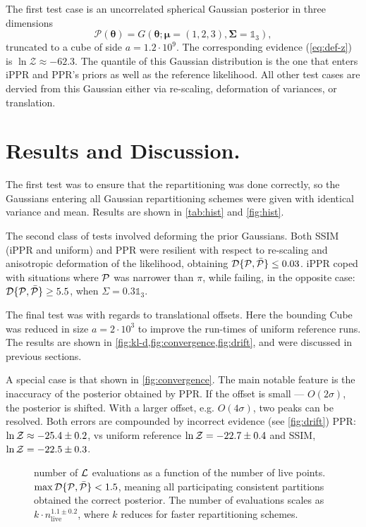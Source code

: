 \documentclass[usenatbib]{mnras}
\begin{document}
The first test case is an uncorrelated spherical Gaussian posterior
in three dimensions
\begin{equation}
\mathcal{P}(\bm{\theta}) = G(\bm{\theta}; \bm{\mu} =
  (1,2,3),\bm{\Sigma} = \mathds{1}_{3}),
\end{equation}
truncated to a cube of side \(a = 1.2 \cdot 10^{9}\). The
corresponding evidence (\cref{eq:def-z}) is
\(\ln \mathcal{Z}\approx-62.3\). The quantile of this Gaussian
distribution is the one that enters iPPR and PPR's priors as well as
the reference likelihood. All other test cases are dervied from this
Gaussian either via re-scaling, deformation of variances, or
translation. 


\section{Results and Discussion.}\label{sec:results}
The first test was to ensure that the repartitioning was done
correctly, so the Gaussians entering all Gaussian repartitioning
schemes were given with identical variance and mean. Results are shown
in \cref{tab:hist} and \cref{fig:hist}.


The second class of tests involved deforming the prior Gaussians.
Both SSIM (iPPR and uniform) and PPR were resilient with respect to
re-scaling and anisotropic deformation of the likelihood, obtaining
${\cal D}\{ {\cal P}, \bar{\cal P}\} \leq 0.03$. iPPR coped with
situations where ${\cal P}$ was narrower than $\pi$, while failing, in
the opposite case: ${\cal D}\{ {\cal P}, \bar{\cal P}\} \geq 5.5$,
when $\Sigma = 0.3 \mathds{1}_{3}$.

The final test was with regards to translational offsets. Here the
bounding Cube was reduced in size \(a = 2\cdot 10^{3}\) to improve the
run-times of uniform reference runs. The results are shown in
\cref{fig:kl-d,fig:convergence,fig:drift}, and were discussed in
previous sections.

A special case is that shown in \cref{fig:convergence}. The main
notable feature is the inaccuracy of the posterior obtained by PPR. If
the offset is small --- \(O(2\sigma)\), the posterior is shifted. With
a larger offset, e.g. \(O(4\sigma)\), two peaks can be resolved.  Both
errors are compounded by incorrect evidence (see \cref{fig:drift})
PPR: \(\ln {\cal Z}\approx -25.4 \pm 0.2\), vs uniform reference
\(\ln {\cal Z} = -22.7 \pm 0.4\) and SSIM,
\(\ln {\cal Z} = -22.5 \pm 0.3\).


\begin{figure}
  
  \caption{number of ${\cal L}$ evaluations as a function of the
    number of live points.
    \(\max {\cal D}\{{\cal P}, \bar{\cal P}\} < 1.5\), meaning all
    participating consistent partitions obtained the correct
    posterior. The number of evaluations scales as
    $k\cdot n_\text{live}^{1.1 \pm 0.2}$, where $k$ reduces for faster
    repartitioning schemes. \label{fig:benchmark}}
\end{figure}
\end{document}
